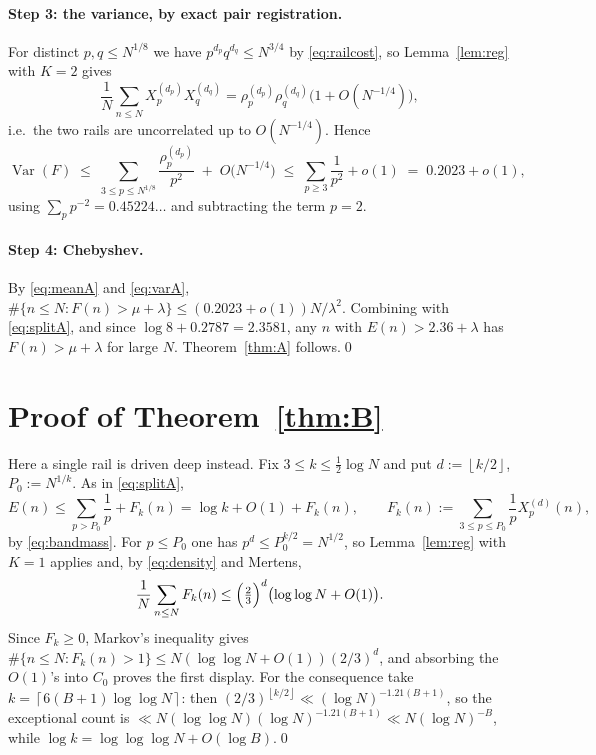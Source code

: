\documentclass[11pt]{article}
\newcommand{\fl}[1]{\left\lfloor #1\right\rfloor}
\newcommand{\cl}[1]{\left\lceil #1\right\rceil}
\begin{document}
\paragraph{Step 3: the variance, by exact pair registration.}
For distinct $p,q\le N^{1/8}$ we have $p^{d_p}q^{d_q}\le N^{3/4}$ by \eqref{eq:railcost},
so Lemma~\ref{lem:reg} with $K=2$ gives
\[
\frac1N\sum_{n\le N}X_p^{(d_p)}X_q^{(d_q)}
=\rho_p^{(d_p)}\rho_q^{(d_q)}\bigl(1+O(N^{-1/4})\bigr),
\]
i.e.\ the two rails are uncorrelated up to $O(N^{-1/4})$.  Hence
\begin{equation}\label{eq:varA}
\operatorname{Var}(F)
\;\le\;\sum_{3\le p\le N^{1/8}}\frac{\rho_p^{(d_p)}}{p^{2}}
\;+\;O\bigl(N^{-1/4}\bigr)
\;\le\;\sum_{p\ge3}\frac1{p^{2}}+o(1)\;=\;0.2023+o(1),
\end{equation}
using $\sum_p p^{-2}=0.45224\ldots$ and subtracting the term $p=2$.

\paragraph{Step 4: Chebyshev.}
By \eqref{eq:meanA} and \eqref{eq:varA},
$\#\{n\le N: F(n)>\mu+\lambda\}\le(0.2023+o(1))N/\lambda^{2}$.  Combining with
\eqref{eq:splitA}, and since $\log8+0.2787=2.3581$, any $n$ with $E(n)>2.36+\lambda$ has
$F(n)>\mu+\lambda$ for large $N$.  Theorem~\ref{thm:A} follows.\qed

\section{Proof of Theorem~\ref{thm:B}}

Here a single rail is driven deep instead.  Fix $3\le k\le\frac12\log N$ and put
$d:=\fl{k/2}$, $P_0:=N^{1/k}$.  As in \eqref{eq:splitA},
\[
E(n)\le\sum_{p>P_0}\frac1p+F_k(n)=\log k+O(1)+F_k(n),
\qquad F_k(n):=\sum_{3\le p\le P_0}\frac1p X_p^{(d)}(n),
\]
by \eqref{eq:bandmass}.  For $p\le P_0$ one has $p^{d}\le P_0^{k/2}=N^{1/2}$, so
Lemma~\ref{lem:reg} with $K=1$ applies and, by \eqref{eq:density} and Mertens,
\[
\frac1N\sum_{n\le N}F_k(n)\le\Bigl(\tfrac23\Bigr)^{d}\bigl(\log\log N+O(1)\bigr).
\]
Since $F_k\ge0$, Markov's inequality gives
$\#\{n\le N:F_k(n)>1\}\le N(\log\log N+O(1))(2/3)^{d}$, and absorbing the $O(1)$'s into
$C_0$ proves the first display.  For the consequence take
$k=\cl{6(B+1)\log\log N}$: then $(2/3)^{\fl{k/2}}\ll(\log N)^{-1.21(B+1)}$, so the
exceptional count is $\ll N(\log\log N)(\log N)^{-1.21(B+1)}\ll N(\log N)^{-B}$, while
$\log k=\log\log\log N+O(\log B)$.\qed
\end{document}
